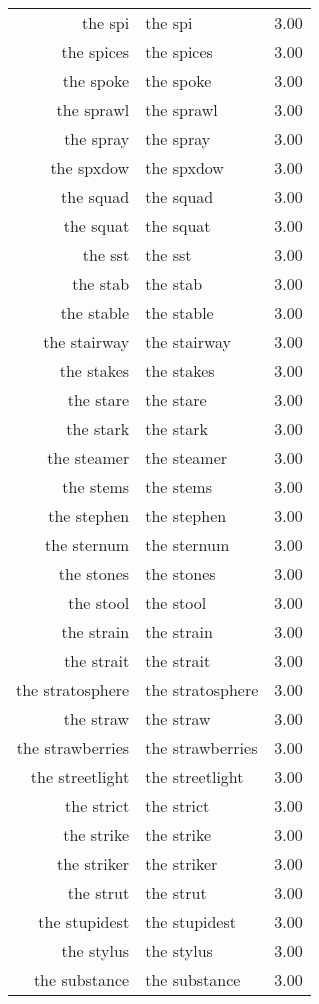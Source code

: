 \begin{table}[ht]
\begin{tabular}{rlr}
  the spi & the spi & 3.00 \\ 
  the spices & the spices & 3.00 \\ 
  the spoke & the spoke & 3.00 \\ 
  the sprawl & the sprawl & 3.00 \\ 
  the spray & the spray & 3.00 \\ 
  the spxdow & the spxdow & 3.00 \\ 
  the squad & the squad & 3.00 \\ 
  the squat & the squat & 3.00 \\ 
  the sst & the sst & 3.00 \\ 
  the stab & the stab & 3.00 \\ 
  the stable & the stable & 3.00 \\ 
  the stairway & the stairway & 3.00 \\ 
  the stakes & the stakes & 3.00 \\ 
  the stare & the stare & 3.00 \\ 
  the stark & the stark & 3.00 \\ 
  the steamer & the steamer & 3.00 \\ 
  the stems & the stems & 3.00 \\ 
  the stephen & the stephen & 3.00 \\ 
  the sternum & the sternum & 3.00 \\ 
  the stones & the stones & 3.00 \\ 
  the stool & the stool & 3.00 \\ 
  the strain & the strain & 3.00 \\ 
  the strait & the strait & 3.00 \\ 
  the stratosphere & the stratosphere & 3.00 \\ 
  the straw & the straw & 3.00 \\ 
  the strawberries & the strawberries & 3.00 \\ 
  the streetlight & the streetlight & 3.00 \\ 
  the strict & the strict & 3.00 \\ 
  the strike & the strike & 3.00 \\ 
  the striker & the striker & 3.00 \\ 
  the strut & the strut & 3.00 \\ 
  the stupidest & the stupidest & 3.00 \\ 
  the stylus & the stylus & 3.00 \\ 
  the substance & the substance & 3.00 \\ 

\end{tabular}
\end{table}
